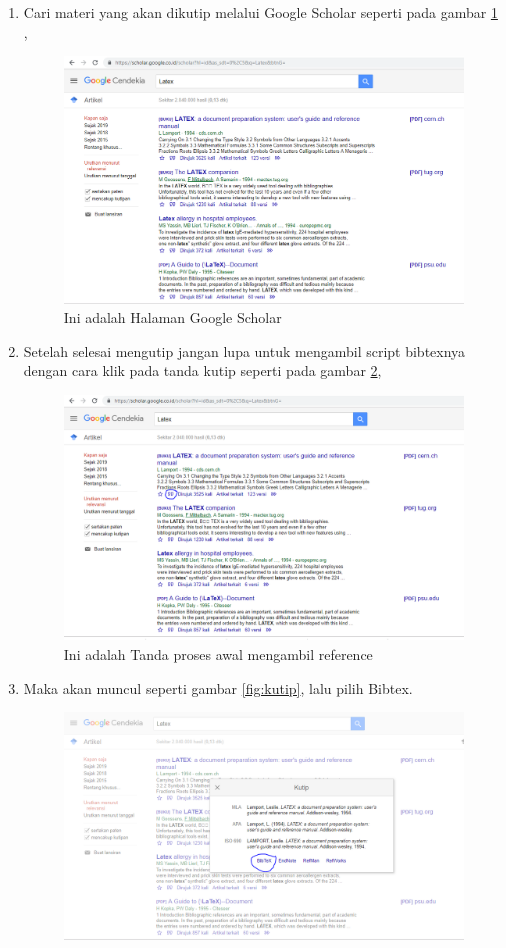 \begin{enumerate}
  \item Cari materi yang akan dikutip melalui Google Scholar seperti pada gambar \ref{fig:scholar} ,
  \begin{figure}[!htbp]
  \centering
  \includegraphics[width=.75\textwidth]{figures/scholar.png}
  \caption{Ini adalah Halaman Google Scholar}\label{fig:scholar}
\end{figure}
  \item Setelah selesai mengutip jangan lupa untuk mengambil script bibtexnya dengan cara klik pada tanda kutip seperti pada gambar \ref{fig:awalbibtex},
  \begin{figure}[!htbp]
  \centering
  \includegraphics[width=.75\textwidth]{figures/awalbibtex.png}
  \caption{Ini adalah Tanda proses awal mengambil reference}\label{fig:awalbibtex}
\end{figure}
  \item Maka akan muncul seperti gambar \ref{fig:kutip}, lalu pilih Bibtex.
  \begin{figure}[!htbp]
  \centering
  \includegraphics[width=.75\textwidth]{figures/kutip.png}

\end{figure}
\end{enumerate}
